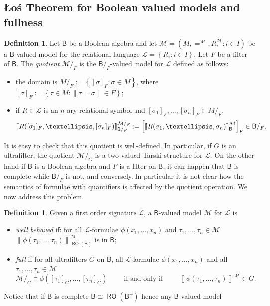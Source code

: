 \documentclass[11pt]{amsart}
\newcommand{\LL}{\mathcal{L}}
\theoremstyle{plain}
\theoremstyle{definition}
\newtheorem{definition}[theorem]{Definition}
\theoremstyle{plain}
\theoremstyle{remark}
\newcommand{\M}{\mathcal{M}}
\DeclareMathOperator{\RO}{\mathsf{RO}}
\newcommand{\bool}[1]{\mathsf{#1}}
\newcommand{\cp}[1]{\left( #1 \right)}
\newcommand{\Qp}[1]{\left\llbracket #1 \right\rrbracket}
\newcommand{\bp}[1]{\left\lbrace #1 \right\rbrace}
\newcommand{\0}{\mathsf{0}}
\renewcommand{\1}{\mathsf{1}}
\renewcommand{\2}{\mathsf{2}}
\theoremstyle{definition}
\begin{document}
\subsection{\L o\'s Theorem for Boolean valued models and fullness}

\begin{definition}\label{def:quotboolmod}
Let $\bool{B}$ be a Boolean algebra and let $\M=\cp{M, =^\M, R^\M_i: i\in I}$ be a $\bool{B}$-valued model for the relational language $\LL=\bp{R_i: i\in I}$. Let $F$ be a filter of $\bool{B}$. The \emph{quotient} $\M/_F$ is the $\bool{B}/_F$-valued model for $\LL$ defined as follows:
\begin{itemize}
\item the domain is $M/_F:=\bp{[\sigma]_F: \sigma\in M}$, where $[\sigma]_F:=\bp{\tau\in M: \Qp{\tau=\sigma}\in F}$;
\item if $R\in\LL$ is an $n$-ary relational symbol and $[\sigma_1]_F, \dots, [\sigma_n]_F\in M/_{F}$,
\[
\Qp{R([\sigma_1]_F, \dots, [\sigma_n]_F)}^{\M/_F}_{\bool{B}/_F}:=\Bigl[\Qp{R(\sigma_1, \dots, \sigma_n)}^\M_{\bool{B}}\Bigr]_F\in\bool{B}/_F.
\]
\end{itemize}
\end{definition}
It is easy to check that this quotient is well-defined. In particular, if $G$ is an ultrafilter, the quotient 
$\M/_G$ is a two-valued Tarski structure for $\LL$.
On the other hand if $\bool{B}$ is a Boolean algebra and $F$ is a filter on $\bool{B}$, it can happen that 
$\bool{B}$ is complete while $\bool{B}/_F$ is not, and conversely. In particular it is not clear how the semantics of 
formulae with quantifiers is affected by the quotient operation. We now address this problem.
\begin{definition}\label{def:fullness-wellbehaved}
Given a first order signature $\LL$,
a $\bool{B}$-valued model $\M$ for $\LL$ is 
\begin{itemize}
\item
\emph{well behaved} if:
for all $\LL$-formulae $\phi(x_1,\dots,x_n)$
and $\tau_1,\dots,\tau_n\in\M$ $\Qp{\phi(\tau_1,\dots,\tau_n)}^\M_{\RO(\bool{B})}$ is in $\bool{B}$;
\item
\emph{full} if for all ultrafilters $G$ on $\bool{B}$, all $\LL$-formulae $\phi(x_1,\dots,x_n)$
and all $\tau_1,\dots,\tau_n\in\M$
\[
\M/_G\models\phi([\tau_1]_G,\dots,[\tau_n]_G)\qquad\text{ if and only if }\qquad\Qp{\phi(\tau_1,\dots,\tau_n)}^\M\in G.
\]
\end{itemize}
\end{definition}
Notice that if $\bool{B}$ is complete $\bool{B}\cong\RO(\bool{B}^+)$ hence any $\bool{B}$-valued model 
\end{document}
